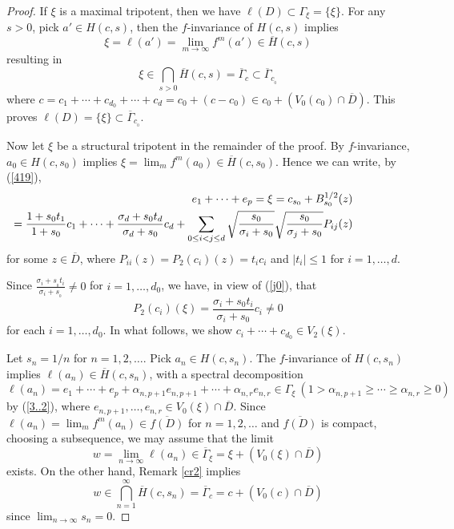 \documentclass[12pt, twoside]{article}
\theoremstyle{definition}
\numberwithin{equation}{section}
\begin{document}
\begin{proof}
If $\xi$ is a maximal tripotent, then we have $\ell(D) \subset \Gamma_\xi = \{\xi\}$.
 For any $s>0$, pick $a'\in H(c,s)$, then the $f$-invariance of $H(c,s)$ implies
$$\xi = \ell(a') = \lim_{m\rightarrow \infty} f^m(a') \in \overline H(c,s)$$
resulting in $$\xi \in \bigcap_{s>0} \overline H(c,s) = \overline\Gamma_c \subset \overline\Gamma_{c_{_0}}$$
where $c= c_1 + \cdots + c_{d_0} + \cdots + c_d =c_0 + (c-c_0) \in c_0 + (V_0(c_0)\cap \overline D)$.
This proves  $\ell(D)=\{\xi\} \subset  \overline\Gamma_{c_{_0}}$.

Now let $\xi$ be a structural tripotent in the remainder of the proof.
By $f$-invariance, $a_0\in H(c, s_0)$ implies
$\xi= \lim_m f^m(a_0) \in \overline H(c,s_0)$.
Hence we can write, by (\ref{419}),
\begin{eqnarray}\label{j0}
&& \indent\hspace{-.8in}e_1 + \cdots + e_{p} = \xi = c_{s_0} + B_{s_0}^{1/2}(z) \nonumber\\
 &&\indent\hspace{-1in}= \frac{1+s_0t_1}{1+s_0} c_1 + \cdots +  \frac{\sigma_d+s_0t_d}{\sigma_d +s_0}c_d + \sum_{0\leq i<j \leq d}
\sqrt{\frac{s_0}{\sigma_i +s_0}}\sqrt{\frac{s_0}{\sigma_j +s_0}}P_{ij}(z)
\end{eqnarray}
for some $z\in \overline D$, where $P_{ii}(z) = P_2(c_i)(z) = t_i c_i$  and $|t_i|\leq 1$ for $i= 1, \ldots, d$.

Since $\frac{\sigma_i+s_{_0}t_i}{\sigma_i+s_{_0}}\neq 0$ for $i=1, \ldots, d_0$,
 we have,  in view of (\ref{j0}), that
$$P_2(c_i)(\xi) = \frac{\sigma_i+s_0t_i}{\sigma_i+s_0} c_i \neq 0$$
for each $i = 1, \ldots, d_0$. In what follows, we show $ c_i + \cdots +c_{d_0} \in V_2(\xi)$.


Let $s_n=1/n$ for $n=1,2, \ldots$. Pick $a_n \in H(c, s_n)$.
The $f$-invariance of $H(c, s_n)$ implies $\ell(a_n) \in \overline H(c,s_n)$, with a spectral decomposition
$$\ell(a_n) = e_1 + \cdots + e_p + \alpha_{n,p+1}e_{n, p+1} + \cdots + \alpha_{n, r}e_{n, r} \in \Gamma_\xi
~
(1> \alpha_{n, p+1} \geq \cdots \geq \alpha_{n,r}\geq 0)$$
by (\ref{3..2}), where $e_{n,p+1}, \ldots, e_{n,r} \in V_0(\xi)\cap \overline D$.
Since $\ell(a_n) =\lim_m f^m(a_n) \in \overline{f(D)}$ for $n=1,2, \ldots$
and $\overline{f(D)}$ is compact, choosing a subsequence, we may assume that
the limit
\begin{equation}\label{w}
 w=\lim_{n\rightarrow \infty} \ell(a_n)\in \overline\Gamma_\xi = \xi +(V_0(\xi)\cap \overline D)
 \end{equation} exists.
On the other hand,  Remark \ref{cr2} implies
\begin{equation}\label{w'}
 w \in \bigcap_{n=1}^\infty \overline H(c, s_n) = \overline \Gamma_c= c + (V_0(c) \cap \overline D)
 \end{equation}
since $\displaystyle \lim_{n\rightarrow \infty} s_n =0$.



\end{proof}
\end{document}
